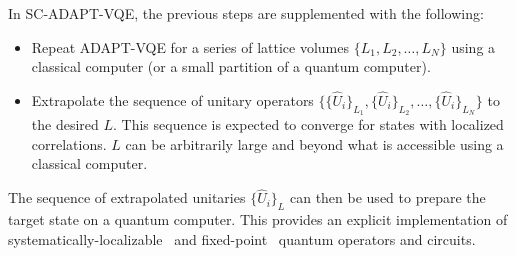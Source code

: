 \documentclass[aps, prc, tightenlines,superscriptaddress, letterpaper, amsmath, amssymb, preprintnumbers, floatfix, longbibliography, nofootinbib]{revtex4-2}
\begin{document}
In SC-ADAPT-VQE, the previous steps are supplemented with the following:
%
\begin{itemize}
    \item[8.] Repeat ADAPT-VQE for a series of lattice volumes $\{L_1, L_2, \ldots, L_N\}$ using a classical computer (or a small partition of a quantum computer).
    \item[9.] Extrapolate the sequence of unitary operators $\{\{\hat{U}_i\}_{L_1}, \{\hat{U}_i\}_{L_2}, \ldots, \{\hat{U}_i\}_{L_N}\}$ to the desired $L$.
    This sequence is expected to converge for states with localized correlations.
    $L$ can be arbitrarily large and beyond what is accessible
     using a classical computer.
\end{itemize}
%
The sequence of extrapolated unitaries $\{\hat{U}_i\}_L$ can then be used to prepare the target state on a quantum computer.
This provides an explicit implementation of systematically-localizable~\cite{Klco:2019yrb} and fixed-point~\cite{Klco:2020aud} quantum operators and circuits.




\end{document}
